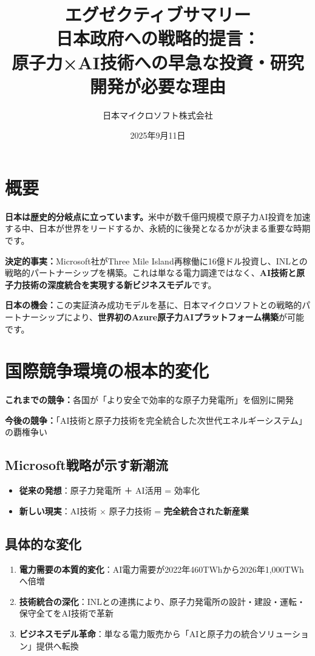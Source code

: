 \documentclass[10pt,a4paper]{jsarticle}
\title{\LARGE\textbf{エグゼクティブサマリー}\\

\vspace{2cm}
\Large 日本政府への戦略的提言：\\原子力×AI技術への早急な投資・研究開発が必要な理由}
\author{日本マイクロソフト株式会社}
\date{2025年9月11日}
\begin{document}
\maketitle
\thispagestyle{empty}

\newpage

\section*{概要}

\textbf{日本は歴史的分岐点に立っています。}米中が数千億円規模で原子力AI投資を加速する中、日本が世界をリードするか、永続的に後発となるかが決まる重要な時期です。

\textbf{決定的事実：}Microsoft社がThree Mile Island再稼働に16億ドル投資し\cite{constellation2024}、INLとの戦略的パートナーシップを構築\cite{inl2025}。これは単なる電力調達ではなく、\textbf{AI技術と原子力技術の深度統合を実現する新ビジネスモデル}です。

\textbf{日本の機会：}この実証済み成功モデルを基に、日本マイクロソフトとの戦略的パートナーシップにより、\textbf{世界初のAzure原子力AIプラットフォーム構築}が可能です。

\section{国際競争環境の根本的変化}

\textbf{これまでの競争：}各国が「より安全で効率的な原子力発電所」を個別に開発

\textbf{今後の競争：}「AI技術と原子力技術を完全統合した次世代エネルギーシステム」の覇権争い

\subsection{Microsoft戦略が示す新潮流}
\begin{itemize}
    \item \textbf{従来の発想}：原子力発電所 ＋ AI活用 = 効率化
    \item \textbf{新しい現実}：AI技術 × 原子力技術 = \textbf{完全統合された新産業}
\end{itemize}

\subsection{具体的な変化}
\begin{enumerate}
    \item \textbf{電力需要の本質的変化}：AI電力需要が2022年460TWhから2026年1,000TWhへ倍増
    \item \textbf{技術統合の深化}：INLとの連携により、原子力発電所の設計・建設・運転・保守全てをAI技術で革新
    \item \textbf{ビジネスモデル革命}：単なる電力販売から「AIと原子力の統合ソリューション」提供へ転換
\end{enumerate}
\end{document}
